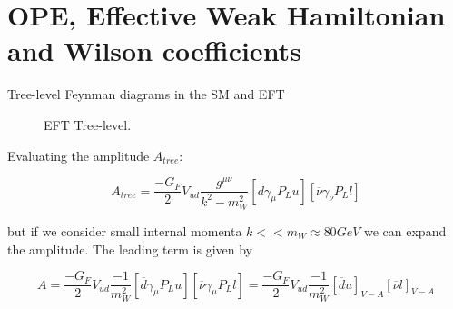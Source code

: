 \documentclass[11pt]{beamer}
\begin{document}
\section{OPE, Effective Weak Hamiltonian and Wilson coefficients}

\begin{frame}{Tree-level Feynman diagrams in the SM and EFT}
\begin{figure}[H]
\centering

\begin{minipage}[b]{0.45\linewidth}
\centering
\vspace{.2cm}
\vspace{.2cm}
\caption{SM tree-level.}
\label{treelevelfull}
\end{minipage}
\hfill
\begin{minipage}[b]{0.45\linewidth}
\centering
\vspace{.2cm}
\vspace{.2cm}
\caption{EFT Tree-level.}
\label{treeleveleft}
\end{minipage}
\end{figure}
\small
Evaluating the amplitude $A_{tree}$:

\begin{equation}
    A_{tree} = \frac{- G_F}{2} V_{ud} \frac{g^{\mu \nu}}{k^2 - m_W^2} [\overline{d} \gamma_\mu P_L u ] [\overline{\nu} \gamma_\nu P_L l ] 
\end{equation}

  but if we consider small internal momenta $k << m_W \approx 80 GeV$ we can expand the amplitude. The leading term is given by

    \begin{equation}
    A = \frac{- G_F}{2} V_{ud} \frac{-1}{m_W^2} [\overline{d} \gamma_\mu P_L u ] [\overline{\nu} \gamma_\mu P_L l ] = \frac{- G_F}{2} V_{ud} \frac{-1}{m_W^2} [\overline{d} u ]_{V-A} [\overline{\nu} l ]_{V-A}
\end{equation}
\end{frame}
\end{document}
